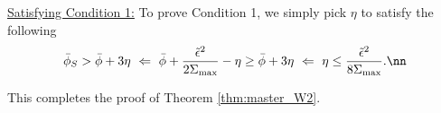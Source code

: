 \vspace{5pt}
\noindent\underline{Satisfying Condition 1:} To prove Condition 1, we simply pick $\eta$ to satisfy the following
\begin{align}
\bar\phi_S > \bar\phi + 3 \eta ~\Leftarrow~ \bar\phi + \frac{\tilde\epsilon^2}{2\Sigma_{\max}} - \eta \geq \bar\phi + 3 \eta ~\Leftarrow~ \eta \leq \frac{\tilde\epsilon^2}{8\Sigma_{\max}}.\nn
\end{align}


This completes the proof of Theorem \ref{thm:master_W2}.

~~~~
~~~~
